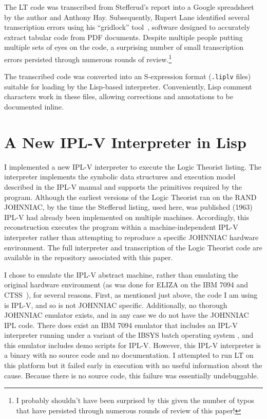 \documentclass[journal]{IEEEtran}
\begin{document}
The LT code was transcribed from Stefferud's report into a Google
spreadsheet by the author and Anthony Hay. Subsequently, Rupert Lane
identified several transcription errors using his ``gridlock''
tool~\cite{lane2024gridlock}, software designed to accurately extract
tabular code from PDF documents. Despite multiple people putting
multiple sets of eyes on the code, a surprising number of small
transcription errors persisted through numerous rounds of
review.\footnote{I probably shouldn't have been surprised by this
given the number of typos that have persisted through numerous rounds
of review of this paper!}

The transcribed code was converted into an S-expression format
(\texttt{.liplv} files) suitable for loading by the Lisp-based
interpreter. Conveniently, Lisp comment characters work in these
files, allowing corrections and annotations to be documented inline.

\section{A New IPL-V Interpreter in Lisp}
\label{sec:interpreter}

I implemented a new IPL-V interpreter to execute the Logic Theorist
listing. The interpreter implements the symbolic data structures and
execution model described in the IPL-V manual and supports the
primitives required by the program. Although the earliest versions of
the Logic Theorist ran on the RAND JOHNNIAC, by the time the Stefferud
listing, used here, was published (1963) IPL-V had already been
implemented on multiple machines. Accordingly, this reconstruction
executes the program within a machine-independent IPL-V interpreter
rather than attempting to reproduce a specific JOHNNIAC hardware
environment. The full interpreter and transcription of the Logic
Theorist code are available in the repository associated with this
paper.

I chose to emulate the IPL-V abstract machine, rather than emulating
the original hardware environment (as was done for ELIZA on the IBM
7094 and CTSS~\cite{lane2025eliza}), for several reasons. First, as
mentioned just above, the code I am using is IPL-V, and so is not
JOHNNIAC specific. Additionally, no thorough JOHNNIAC emulator exists,
and in any case we do not have the JOHNNIAC IPL code. There does exist
an IBM 7094 emulator that includes an IPL-V interpreter running under
a variant of the IBSYS batch operating system \cite{ibsys}, and this
emulator includes demo scripts for IPL-V. However, this IPL-V
interpreter is a binary with no source code and no documentation. I
attempted to run LT on this platform but it failed early in execution
with no useful information about the cause. Because there is no source
code, this failure was essentially undebuggable.
\end{document}
